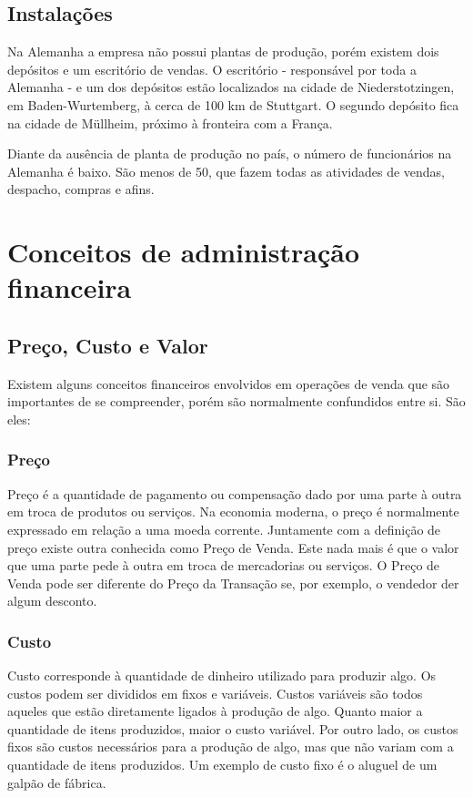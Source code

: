 \documentclass[12pt]{article}
\begin{document}
\subsection{Instalações}
	
	Na Alemanha a empresa não possui plantas de produção, porém existem dois depósitos e um escritório de vendas. O escritório - responsável por toda a Alemanha - e um dos depósitos estão localizados na cidade de Niederstotzingen, em Baden-Wurtemberg, à cerca de 100 km de Stuttgart. O segundo depósito fica na cidade de Müllheim, próximo à fronteira com a França.

	Diante da ausência de planta de produção no país, o número de funcionários na Alemanha é baixo. São menos de 50, que fazem todas as atividades de vendas, despacho, compras e afins.

\section{Conceitos de administração financeira}

\subsection{Preço, Custo e Valor}
	
	Existem alguns conceitos financeiros envolvidos em operações de venda que são importantes de se compreender, porém são normalmente confundidos entre si. São eles:

\subsubsection{Preço}

	Preço é a quantidade de pagamento ou compensação dado por uma parte à outra em troca de produtos ou serviços. Na economia moderna, o preço é normalmente expressado em relação a uma moeda corrente. Juntamente com a definição de preço existe outra conhecida como Preço de Venda. Este nada mais é que o valor que uma parte pede à outra em troca de mercadorias ou serviços. O Preço de Venda pode ser diferente do Preço da Transação se, por exemplo, o vendedor der algum desconto.

\subsubsection{Custo}

	Custo corresponde à quantidade de dinheiro utilizado para produzir algo. Os custos podem ser divididos em fixos e variáveis. Custos variáveis são todos aqueles que estão diretamente ligados à produção de algo. Quanto maior a quantidade de itens produzidos, maior o custo variável. Por outro lado, os custos fixos são custos necessários para a produção de algo, mas que não variam com a quantidade de itens produzidos. Um exemplo de custo fixo é o aluguel de um galpão de fábrica.
\end{document}
